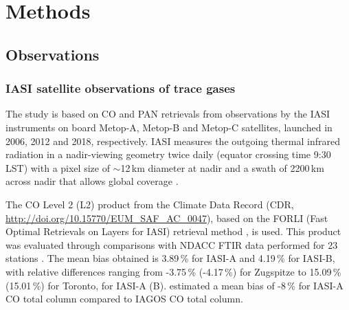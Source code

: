 \documentclass[acp, manuscript]{copernicus}
\begin{document}
\section{Methods}{\label{MaterialandMethod_chap4}}

\subsection{Observations}\label{method_atm_obs_CO_chap4}


\subsubsection{IASI satellite observations of trace gases}

The study is based on CO and PAN retrievals from observations by the IASI instruments on board Metop-A, Metop-B and Metop-C satellites, launched in 2006, 2012 and 2018, respectively. IASI measures the outgoing thermal infrared radiation  in a nadir-viewing geometry twice daily (equator crossing time 9:30 LST) with a pixel size of \(\sim\)12\,km diameter at nadir and a swath of 2200\,km across nadir that allows global coverage \citep{clerbauxMonitoringAtmosphericComposition2009a}.

The CO Level 2 (L2) product from the Climate Data Record (CDR, \url{http://doi.org/10.15770/EUM_SAF_AC_0047}), based on the  FORLI (Fast Optimal Retrievals on Layers for IASI) retrieval method \citep{hurtmansFORLIRadiativeTransfer2012a}, is used.
This product was evaluated through comparisons with NDACC FTIR data performed for 23 stations \citep{Langerock2024}. The mean bias obtained is 3.89\,\% for IASI-A and 4.19\,\% for IASI-B, with relative differences ranging from -3.75\,\% (-4.17\,\%) for Zugspitze to 15.09\,\% (15.01\,\%) for Toronto, for IASI-A (B). \citet{barretValidation12Years2025} estimated a mean bias of -8\,\% for IASI-A CO total column compared to IAGOS CO total column. 
\end{document}
